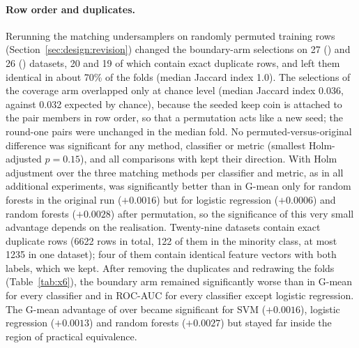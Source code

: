 \paragraph{Row order and duplicates.} Rerunning the matching undersamplers on randomly permuted training rows (Section~\ref{sec:design:revision}) changed the boundary-arm selections on 27 (\MUSBS) and 26 (\MUSBO) datasets, 20 and 19 of which contain exact duplicate rows, and left them identical in about 70\% of the folds (median Jaccard index 1.0). The selections of the coverage arm overlapped only at chance level (median Jaccard index 0.036, against 0.032 expected by chance), because the seeded keep coin is attached to the pair members in row order, so that a permutation acts like a new seed; the round-one pairs were unchanged in the median fold. No permuted-versus-original difference was significant for any method, classifier or metric (smallest Holm-adjusted $p=0.15$), and all comparisons with \RUS{} kept their direction. With Holm adjustment over the three matching methods per classifier and metric, as in all additional experiments, \MUSCS{} was significantly better than \RUS{} in G-mean only for random forests in the original run ($+0.0016$) but for logistic regression ($+0.0006$) and random forests ($+0.0028$) after permutation, so the significance of this very small advantage depends on the realisation. Twenty-nine datasets contain exact duplicate rows (6622 rows in total, 122 of them in the minority class, at most 1235 in one dataset); four of them contain identical feature vectors with both labels, which we kept. After removing the duplicates and redrawing the folds (Table~\ref{tab:x6}), the boundary arm remained significantly worse than \RUS{} in G-mean for every classifier and in ROC-AUC for every classifier except logistic regression. The G-mean advantage of \MUSCS{} over \RUS{} became significant for SVM ($+0.0016$), logistic regression ($+0.0013$) and random forests ($+0.0027$) but stayed far inside the region of practical equivalence.


